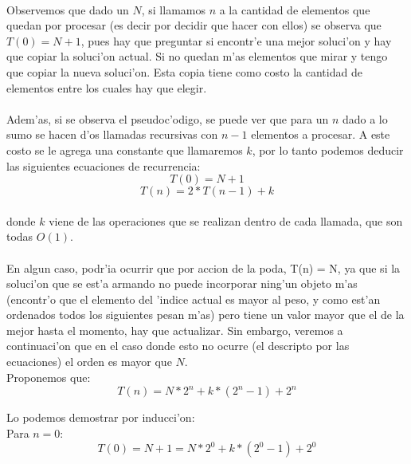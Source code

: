 \paragraph{}
Observemos que dado un $N$, si llamamos $n$ a la cantidad de elementos que quedan por procesar (es decir por 
decidir que hacer con ellos) se observa que $T(0) = N + 1$, pues hay que preguntar si encontr'e una 
mejor soluci'on y hay que copiar la soluci'on actual. Si no quedan m'as elementos que mirar y tengo que copiar 
la nueva soluci'on. Esta copia tiene como costo la cantidad de elementos entre los cuales hay que elegir.
\paragraph{}
Adem'as, si se observa el pseudoc'odigo, se puede ver que para un $n$ dado a lo sumo se hacen d'os llamadas 
recursivas con $n - 1$ elementos a procesar. A este costo se le agrega una constante que llamaremos $k$, 
por lo tanto podemos deducir las siguientes ecuaciones de recurrencia:\\

$$T(0) = N + 1$$
$$T(n) = 2*T(n-1) + k$$

\paragraph{}
donde $k$ viene de las operaciones que se realizan dentro de cada llamada, que son todas $O(1)$.
\paragraph{}
En algun caso, podr'ia ocurrir que por accion de la poda, T(n) = N, ya que si la soluci'on que 
se est'a armando no puede incorporar ning'un objeto m'as (encontr'o que el elemento del 'indice actual 
es mayor al peso, y como est'an ordenados todos los siguientes pesan m'as) pero tiene un valor mayor 
que el de la mejor hasta el momento, hay que actualizar. Sin embargo, veremos a continuaci'on que en el 
caso donde esto no ocurre (el descripto por las ecuaciones) el orden es mayor que $N$.\\

Proponemos que: $$T(n) = N*2^n + k*(2^n-1) + 2^n$$

Lo podemos demostrar por inducci'on:\\

Para $n = 0$:\\

$$T(0) = N + 1 =  N*2^0 + k*(2^0-1) + 2^0$$

